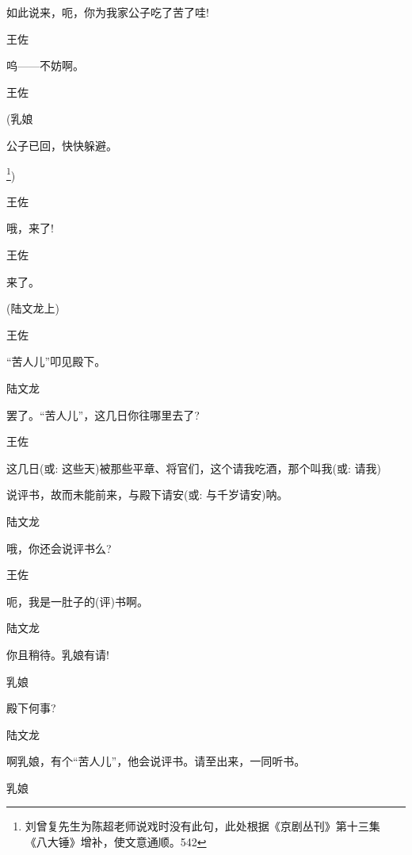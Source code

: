 {{{如此说来，呃，你为我家公子吃了苦了哇!}

{王佐\hspace{30pt}~

呜------不妨啊。}

{王佐

 }

{(乳娘

公子已回，快快躲避。}\footnote{ 刘曾复先生为陈超老师说戏时没有此句，此处根据《京剧丛刊》第十三集  《八大锤》增补，使文意通顺。{542}}{)}

{王佐\hspace{30pt}~

哦，来了!}

{王佐\hspace{30pt}~

来了。}

{(陆文龙上)}

{王佐\hspace{30pt}~

``苦人儿''叩见殿下。}

{陆文龙\hspace{20pt}~

罢了。``苦人儿''，这几日你往哪里去了?}

{王佐

这几日({\akai 或}: 这些天)被那些平章、将官们，这个请我吃酒，那个叫我({\akai 或}: 请我)

说评书，故而未能前来，与殿下请安({\akai 或}: 与千岁请安)呐。}

{陆文龙\hspace{20pt}~

哦，你还会说评书么?}

{王佐\hspace{30pt}~

呃，我是一肚子的(评)书啊。}

{陆文龙\hspace{20pt}~

你且稍待。乳娘有请!}

{乳娘\hspace{30pt}~

殿下何事?}

{陆文龙\hspace{20pt}~

啊乳娘，有个``苦人儿''，他会说评书。请至出来，一同听书。}

{乳娘\hspace{30pt}~

}}}
